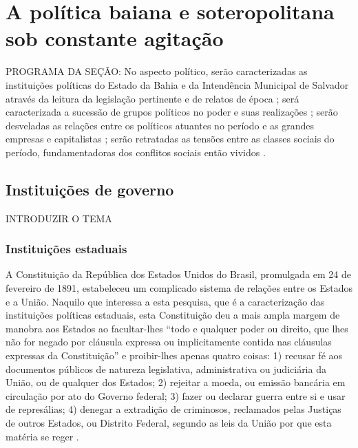 \section{A política baiana e soteropolitana sob constante agitação}\label{sec:1.3}

PROGRAMA DA SEÇÃO: No aspecto político, serão caracterizadas as instituições políticas do Estado da Bahia e da Intendência Municipal de Salvador através da leitura da legislação pertinente e de relatos de época \cite{ruy_politica_1949, ruy_camara_1953}; será caracterizada a sucessão de grupos políticos no poder e suas realizações \cite{CUNHA2011, pang_coronelismo_1979, sampaio_partidos_1978, tavares_historia_2008}; serão desveladas as relações entre os políticos atuantes no período e as grandes empresas e capitalistas \cite{CUNHA2011}; serão retratadas as tensões entre as classes sociais do período, fundamentadoras dos conflitos sociais então vividos \cite{CUNHA2011, leite_bahiaciviliza_1996, santos_repovo_2001, souza_trabalholivre_2011}.

\subsection{Instituições de governo}

INTRODUZIR O TEMA

\subsubsection{Instituições estaduais}

A Constituição da República dos Estados Unidos do Brasil, promulgada em 24 de fevereiro de 1891, estabeleceu um complicado sistema de relações entre os Estados e a União. Naquilo que interessa a esta pesquisa, que é a caracterização das instituições políticas estaduais, esta Constituição deu a mais ampla margem de manobra aos Estados ao facultar-lhes ``todo  e  qualquer  poder  ou  direito,  que  lhes  não  for  negado  por  cláusula  expressa  ou implicitamente contida nas cláusulas expressas da Constituição'' \cite[art.~65,~nº~2]{brasil_constituicao_1891} e proibir-lhes apenas quatro coisas: 1) recusar fé aos documentos públicos de natureza legislativa, administrativa ou judiciária da União, ou de qualquer dos Estados; 2) rejeitar a moeda, ou emissão bancária em circulação por ato do Governo federal; 3) fazer ou declarar guerra entre si e usar de represálias; 4) denegar a extradição de criminosos, reclamados pelas Justiças de outros Estados, ou Distrito Federal, segundo as leis da União por que esta matéria se reger \cite[art.~66,~nº~1~a~4]{brasil_constituicao_1891}.

